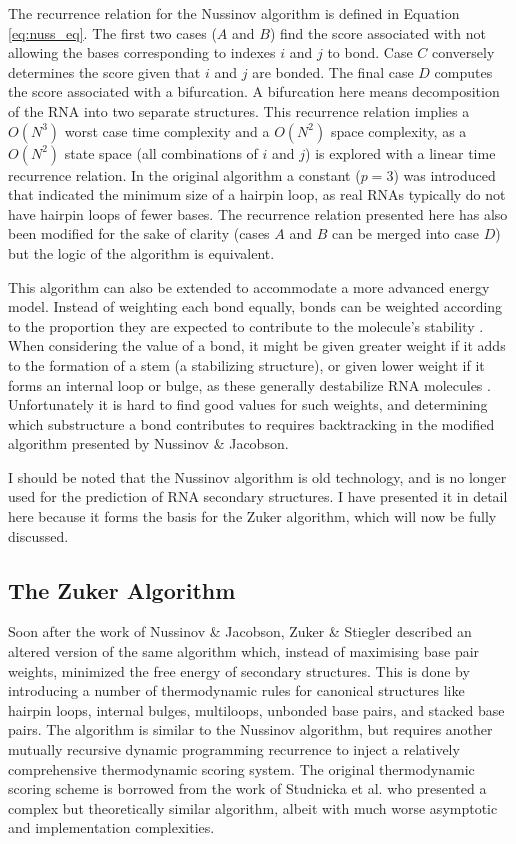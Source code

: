 \documentclass{cshonours}
\begin{document}
The recurrence relation for the Nussinov algorithm is defined in Equation \ref{eq:nuss_eq}. The first two cases ($A$ and $B$) find the score associated with not allowing the bases corresponding to indexes $i$ and $j$ to bond. Case $C$ conversely determines the score given that $i$ and $j$ are bonded. The final case $D$ computes the score associated with a bifurcation. A bifurcation here means decomposition of the RNA into two separate structures. This recurrence relation implies a $O(N^3)$
worst case time complexity and a $O(N^2)$ space complexity, as a $O(N^2)$ state space (all combinations of $i$ and $j$) is explored
with a linear time recurrence relation. In the original algorithm a constant ($p = 3$) was introduced that indicated the minimum size of a hairpin loop, as real RNAs typically do not have hairpin loops of fewer bases. The recurrence relation presented here has also been modified for the sake of clarity (cases $A$ and $B$ can be merged into case $D$) but the logic of the algorithm is equivalent.


This algorithm can also be extended to accommodate a more advanced energy
model. Instead of weighting each bond equally, bonds can be weighted
according to the proportion they are expected to contribute to the molecule's
stability \cite{nussinov1980fast}. When considering the value of a bond, it might be given greater
weight if it adds to the formation of a stem (a stabilizing structure), or
given lower weight if it forms an internal loop or bulge, as these generally
destabilize RNA molecules \cite{nussinov1980fast}. Unfortunately it is hard to find good values for
such weights, and determining which substructure a bond contributes to requires
backtracking in the modified algorithm presented by Nussinov \& Jacobson.

I should be noted that the Nussinov algorithm is old technology, and is no longer used for the prediction of RNA secondary structures. I have presented it in detail here because it forms the basis for the Zuker algorithm, which will now be fully discussed.


\subsection{The Zuker Algorithm}

Soon after the work of Nussinov \& Jacobson, Zuker \& Stiegler \cite{zuker1981optimal}
described an altered version of the same algorithm which, instead of maximising
base pair weights, minimized the free energy of secondary structures. This is done
by introducing a number of thermodynamic rules for canonical structures like
hairpin loops, internal bulges, multiloops, unbonded base pairs, and stacked base
pairs. The algorithm is similar to the Nussinov algorithm, but requires another mutually recursive dynamic programming recurrence to inject
a relatively comprehensive thermodynamic scoring system. The original thermodynamic scoring scheme is borrowed from the work of Studnicka et al. \cite{studnicka1978computer} who presented a
complex but theoretically similar algorithm, albeit with
much worse asymptotic and implementation complexities. 
\end{document}

